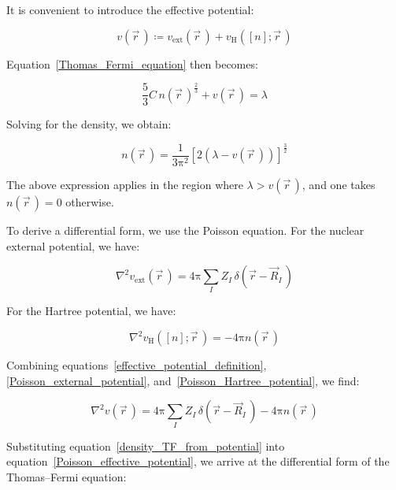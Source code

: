 It is convenient to introduce the effective potential:

\begin{equation}
    v(\vec{r}\,)\coloneqq v_\mathrm{ext}(\vec{r}\,)+v_\mathrm{H}([n];\vec{r}\,)
\label{effective_potential_definition}
\end{equation}

Equation~\eqref{Thomas_Fermi_equation} then becomes:

\begin{equation}
    \frac{5}{3}C\,n(\vec{r}\,)^{\frac{2}{3}}+v(\vec{r}\,)=\lambda
\label{Thomas_Fermi_equation_compact}
\end{equation}

Solving for the density, we obtain:

\begin{equation}
    n(\vec{r}\,)=\frac{1}{3\mathrm{\pi}^2}\left[2\left(\lambda-v(\vec{r}\,)\right)\right]^{\frac{3}{2}}
\label{density_TF_from_potential}
\end{equation}

The above expression applies in the region where $\lambda>v(\vec{r}\,)$,
and one takes $n(\vec{r}\,)=0$ otherwise.

To derive a differential form, we use the Poisson equation.
For the nuclear external potential, we have:

\begin{equation}
    \nabla^2 v_\mathrm{ext}(\vec{r}\,)=4\mathrm{\pi}\sum_I Z_I\,\delta\left(\vec{r}-\vec{R}_I\,\right)
\label{Poisson_external_potential}
\end{equation}

For the Hartree potential, we have:

\begin{equation}
    \nabla^2 v_\mathrm{H}([n];\vec{r}\,)=-4\mathrm{\pi} n(\vec{r}\,)
\label{Poisson_Hartree_potential}
\end{equation}

Combining equations~\eqref{effective_potential_definition}, \eqref{Poisson_external_potential}, and~\eqref{Poisson_Hartree_potential}, we find:

\begin{equation}
    \nabla^2 v(\vec{r}\,)=4\mathrm{\pi}\sum_I Z_I\,\delta\left(\vec{r}-\vec{R}_I\,\right)-4\mathrm{\pi} n(\vec{r}\,)
\label{Poisson_effective_potential}
\end{equation}

Substituting equation~\eqref{density_TF_from_potential} into equation~\eqref{Poisson_effective_potential}, we arrive at the differential form of the Thomas--Fermi equation:

